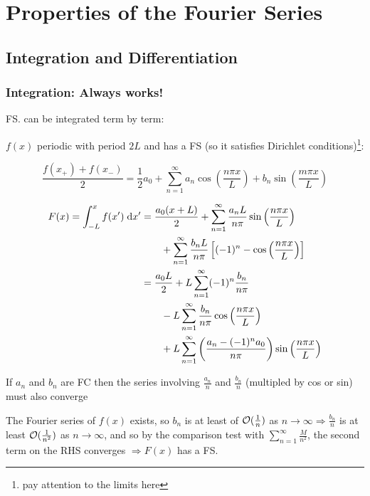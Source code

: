 \documentclass[a4paper]{article}
\begin{document}
\section{Properties of the Fourier Series}

\subsection{Integration and Differentiation}

\subsubsection{Integration: Always works!}

FS. can be integrated term by term:

$ f(x) $ periodic with period $ 2L $ and has a FS (so it satisfies Dirichlet conditions)\footnote{pay attention to the limits here}:

\[ \frac{f(x_{+}) + f(x_{-})}{2} = \frac{1}{2} a_{0} + \sum_{n=1}^{\infty} a_{n} \cos \left( \frac{n \pi x}{L} \right) + b_{n} \sin \left( \frac{m \pi x}{L} \right)   \] 

\begin{align*}
F(x) = \int_{-L}^{x} f(x') \; \mathrm{d} x' & = \frac{a_{0}(x + L)}{2} + \sum_{n=1}^{\infty} \frac{a_{n}L}{n \pi } \sin\left( \frac{n \pi x}{L} \right) \\
& \qquad  + \sum_{n = 1 }^{\infty} \frac{b_{n} L}{n \pi} \left[  (-1)^{n} - \cos \left( \frac{n \pi x}{L} \right)  \right] \\
& = \frac{a_{0}L}{2} + L \sum_{n=1}^{\infty} (-1)^{n} \frac{b_{n}}{n \pi} \\
& \qquad - L \sum_{n = 1 }^{\infty}\frac{b_{n}}{n \pi} \cos\left( \frac{n \pi x}{L} \right)  \\
& \qquad + L \sum_{n = 1 }^{\infty} \left( \frac{a_{n} - (-1)^{n}a_{0}}{n \pi} \right) \sin \left( \frac{n \pi x}{L} \right)  
 \end{align*}
 
If $ a_{n} $ and $ b_{n} $ are FC then the series involving $ \frac{a_{n}}{n} $ and $ \frac{b_{n}}{n}  $ (multipled by cos or sin) must also converge

The Fourier series of $ f(x) $ exists, so $ b_{n} $ is at least of $ \mathcal{O} (\frac{1}{n}) $ as $ n \to \infty \Rightarrow \frac{b_{n}}{n} $ is at least $ \mathcal{O} (\frac{1}{n^{2}}) $ as $ n \to \infty $, and so by the comparison test with $ \sum_{n=1}^{\infty} \frac{M}{n^{2}} $, the second term on the RHS converges $ \Rightarrow F(x) $ has a FS.
\end{document}
